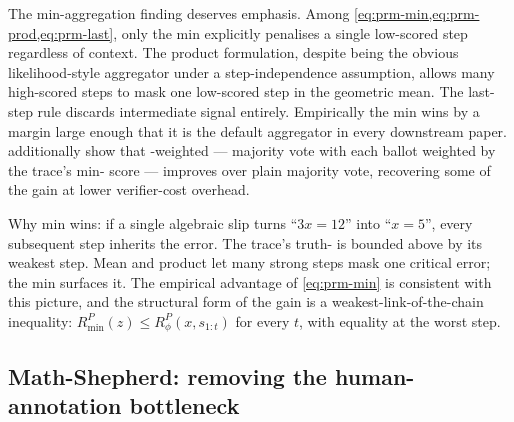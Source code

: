 The min-aggregation finding deserves emphasis. Among
\cref{eq:prm-min,eq:prm-prod,eq:prm-last}, only the min explicitly
penalises a single low-scored step regardless of context. The product
formulation, despite being the obvious likelihood-style aggregator
under a step-independence assumption, allows many high-scored steps
to mask one low-scored step in the geometric mean. The last-step rule
discards intermediate signal entirely. Empirically
\citep[\S 4.2]{lightman2023-prm800k} the min wins by a margin large
enough that it is the default aggregator in every downstream 
paper. \citet[\S 4.3]{lightman2023-prm800k} additionally show that
-weighted  — majority vote with each ballot
weighted by the trace's min- score — improves over plain
majority vote, recovering some of the  gain at lower verifier-cost
overhead.

\begin{intuition}
Why min wins: if a single algebraic slip turns ``$3x = 12$'' into
``$x = 5$'', every subsequent step inherits the error. The trace's
truth- is bounded above by its weakest step. Mean and product
let many strong steps mask one critical error; the min surfaces it.
The empirical advantage of \cref{eq:prm-min} is consistent with
this picture, and the structural form of the gain is a
weakest-link-of-the-chain inequality: $R^P_{\min}(z) \le R^P_\phi(x, s_{1:t})$
for every $t$, with equality at the worst step.
\end{intuition}

\subsection{Math-Shepherd: removing the human-annotation bottleneck}
\label{sec:prm-mathshepherd}

